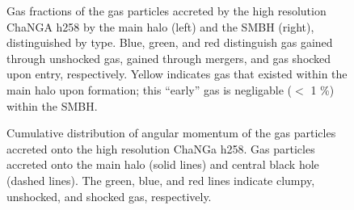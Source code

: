 \documentclass[12pt,headA,chapB]{fiskthesis}
\begin{document}
\begin{figure}[h]
\centerline{}
\caption[ChaNGa h258 Galaxy and SMBH Gas Fractions at z=0]{Gas fractions of the gas particles accreted by the high resolution ChaNGA h258 by the main halo (left) and the SMBH (right), distinguished by type. Blue, green, and red distinguish gas gained through unshocked gas, gained through mergers, and gas shocked upon entry, respectively. Yellow indicates gas that existed within the main halo upon formation; this ``early'' gas is negligable ($<$ 1 \%) within the SMBH.}
\label{hrh258stackfrac} 
\end{figure}

\begin{figure}[h]
\centerline{}
\caption[ChaNGa h258 Cumulative Angular Momentum Distribution]{ Cumulative distribution of angular momentum of the gas particles accreted onto the high resolution ChaNGa h258.  Gas particles accreted onto the main halo (solid lines) and central black hole (dashed lines). The green, blue, and red lines indicate clumpy, unshocked, and shocked gas, respectively.}
\label{hrh258angmom} 
\end{figure}
\end{document}

